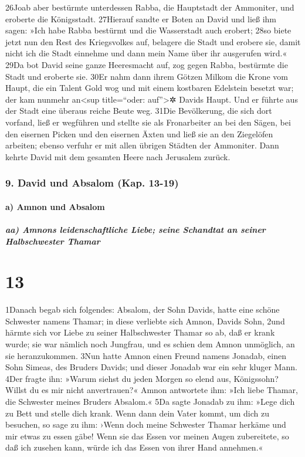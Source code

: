 26Joab aber bestürmte unterdessen Rabba, die Hauptstadt der Ammoniter,
und eroberte die Königsstadt. 27Hierauf sandte er Boten an David und
ließ ihm sagen: »Ich habe Rabba bestürmt und die Wasserstadt auch
erobert; 28so biete jetzt nun den Rest des Kriegsvolkes auf, belagere
die Stadt und erobere sie, damit nicht ich die Stadt einnehme und dann
mein Name über ihr ausgerufen wird.« 29Da bot David seine ganze
Heeresmacht auf, zog gegen Rabba, bestürmte die Stadt und eroberte sie.
30Er nahm dann ihrem Götzen Milkom die Krone vom Haupt, die ein Talent
Gold wog und mit einem kostbaren Edelstein besetzt war; der kam nunmehr
an\textless sup title=``oder: auf''\textgreater✲ Davids Haupt. Und er
führte aus der Stadt eine überaus reiche Beute weg. 31Die Bevölkerung,
die sich dort vorfand, ließ er wegführen und stellte sie als
Fronarbeiter an bei den Sägen, bei den eisernen Picken und den eisernen
Äxten und ließ sie an den Ziegelöfen arbeiten; ebenso verfuhr er mit
allen übrigen Städten der Ammoniter. Dann kehrte David mit dem gesamten
Heere nach Jerusalem zurück.

\hypertarget{david-und-absalom-kap.-13-19}{%
\subsubsection{9. David und Absalom (Kap.
13-19)}\label{david-und-absalom-kap.-13-19}}

\hypertarget{a-amnon-und-absalom}{%
\paragraph{a) Amnon und Absalom}\label{a-amnon-und-absalom}}

\hypertarget{aa-amnons-leidenschaftliche-liebe-seine-schandtat-an-seiner-halbschwester-thamar}{%
\subparagraph{aa) Amnons leidenschaftliche Liebe; seine Schandtat an
seiner Halbschwester
Thamar}\label{aa-amnons-leidenschaftliche-liebe-seine-schandtat-an-seiner-halbschwester-thamar}}

\hypertarget{section-12}{%
\section{13}\label{section-12}}

1Danach begab sich folgendes: Absalom, der Sohn Davids, hatte eine
schöne Schwester namens Thamar; in diese verliebte sich Amnon, Davids
Sohn, 2und härmte sich vor Liebe zu seiner Halbschwester Thamar so ab,
daß er krank wurde; sie war nämlich noch Jungfrau, und es schien dem
Amnon unmöglich, an sie heranzukommen. 3Nun hatte Amnon einen Freund
namens Jonadab, einen Sohn Simeas, des Bruders Davids; und dieser
Jonadab war ein sehr kluger Mann. 4Der fragte ihn: »Warum siehst du
jeden Morgen so elend aus, Königssohn? Willst du es mir nicht
anvertrauen?« Amnon antwortete ihm: »Ich liebe Thamar, die Schwester
meines Bruders Absalom.« 5Da sagte Jonadab zu ihm: »Lege dich zu Bett
und stelle dich krank. Wenn dann dein Vater kommt, um dich zu besuchen,
so sage zu ihm: ›Wenn doch meine Schwester Thamar herkäme und mir etwas
zu essen gäbe! Wenn sie das Essen vor meinen Augen zubereitete, so daß
ich zusehen kann, würde ich das Essen von ihrer Hand annehmen.«

